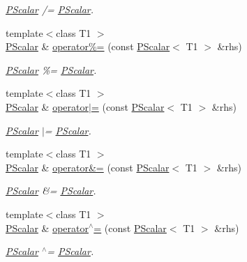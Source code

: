 \begin{DoxyCompactItemize}
\begin{DoxyCompactList}\small\item\em \mbox{\hyperlink{classENSEM_1_1PScalar}{P\+Scalar}} /= \mbox{\hyperlink{classENSEM_1_1PScalar}{P\+Scalar}}. \end{DoxyCompactList}\item 
{\footnotesize template$<$class T1 $>$ }\\\mbox{\hyperlink{classENSEM_1_1PScalar}{P\+Scalar}} \& \mbox{\hyperlink{classENSEM_1_1PScalar_ab583ff2667eba7d2bed2acbd3c15e43e}{operator\%=}} (const \mbox{\hyperlink{classENSEM_1_1PScalar}{P\+Scalar}}$<$ T1 $>$ \&rhs)
\begin{DoxyCompactList}\small\item\em \mbox{\hyperlink{classENSEM_1_1PScalar}{P\+Scalar}} \%= \mbox{\hyperlink{classENSEM_1_1PScalar}{P\+Scalar}}. \end{DoxyCompactList}\item 
{\footnotesize template$<$class T1 $>$ }\\\mbox{\hyperlink{classENSEM_1_1PScalar}{P\+Scalar}} \& \mbox{\hyperlink{classENSEM_1_1PScalar_a59ee3adbb8dabcfb25aae9f9390dcef0}{operator$\vert$=}} (const \mbox{\hyperlink{classENSEM_1_1PScalar}{P\+Scalar}}$<$ T1 $>$ \&rhs)
\begin{DoxyCompactList}\small\item\em \mbox{\hyperlink{classENSEM_1_1PScalar}{P\+Scalar}} $\vert$= \mbox{\hyperlink{classENSEM_1_1PScalar}{P\+Scalar}}. \end{DoxyCompactList}\item 
{\footnotesize template$<$class T1 $>$ }\\\mbox{\hyperlink{classENSEM_1_1PScalar}{P\+Scalar}} \& \mbox{\hyperlink{classENSEM_1_1PScalar_a9c683c36c7129b6b016af09f8d5cda42}{operator\&=}} (const \mbox{\hyperlink{classENSEM_1_1PScalar}{P\+Scalar}}$<$ T1 $>$ \&rhs)
\begin{DoxyCompactList}\small\item\em \mbox{\hyperlink{classENSEM_1_1PScalar}{P\+Scalar}} \&= \mbox{\hyperlink{classENSEM_1_1PScalar}{P\+Scalar}}. \end{DoxyCompactList}\item 
{\footnotesize template$<$class T1 $>$ }\\\mbox{\hyperlink{classENSEM_1_1PScalar}{P\+Scalar}} \& \mbox{\hyperlink{classENSEM_1_1PScalar_a3f256371cc925f01209559addfcbb632}{operator$^\wedge$=}} (const \mbox{\hyperlink{classENSEM_1_1PScalar}{P\+Scalar}}$<$ T1 $>$ \&rhs)
\begin{DoxyCompactList}\small\item\em \mbox{\hyperlink{classENSEM_1_1PScalar}{P\+Scalar}} $^\wedge$= \mbox{\hyperlink{classENSEM_1_1PScalar}{P\+Scalar}}. \end{DoxyCompactList}\item 

\end{DoxyCompactItemize}
